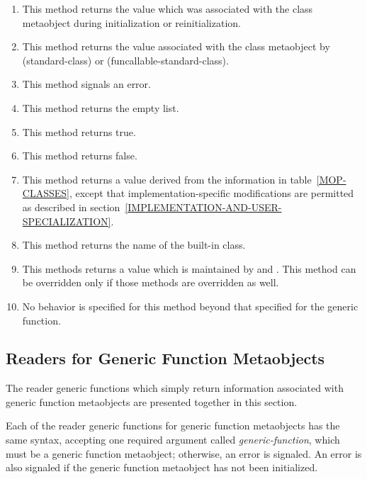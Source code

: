 \begin{enumerate}
\item This method returns the value which was associated with the class
  metaobject during initialization or reinitialization.

\item This method returns the value associated with the class metaobject by
   (standard-class) or 
  (funcallable-standard-class).

\item This method signals an error.

\item This method returns the empty list.

\item This method returns true.

\item This method returns false.

\item This method returns a value derived from the information in
  table~\ref{MOP-CLASSES}, except that implementation-specific modifications are
  permitted as described in
  section~\ref{IMPLEMENTATION-AND-USER-SPECIALIZATION}.

\item This method returns the name of the built-in class.

\item This methods returns a value which is maintained by  and . This method can be
  overridden only if those methods are overridden as well.

\item No behavior is specified for this method beyond that specified for the
  generic function.
\end{enumerate}

\subsection{Readers for Generic Function Metaobjects}
\label{READERS-FOR-GENERIC-FUNCTION-METAOBJECTS}

The reader generic functions which simply return information associated with
generic function metaobjects are presented together in this section.

Each of the reader generic functions for generic function metaobjects has the
same syntax, accepting one required argument called \emph{generic-function},
which must be a generic function metaobject; otherwise, an error is signaled. An
error is also signaled if the generic function metaobject has not been
initialized.

